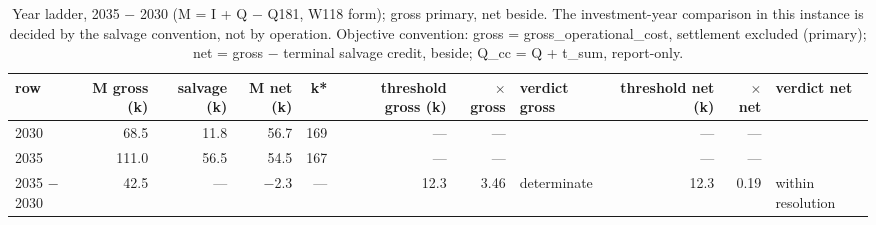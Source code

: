 \begin{table}[htbp]
\centering
\scriptsize
\caption{Year ladder, 2035 $-$ 2030 (M = I + Q $-$ Q181, W118 form); gross primary, net beside. The investment-year comparison in this instance is decided by the salvage convention, not by operation. Objective convention: gross = gross\_operational\_cost, settlement excluded (primary); net = gross $-$ terminal salvage credit, beside; Q\_cc = Q + t\_sum, report-only.}
\label{tab:T4}
\begin{tabular}{lrrrrrrlrrl}
\toprule
row & M gross (k\texteuro{}) & salvage (k\texteuro{}) & M net (k\texteuro{}) & k* & threshold gross (k\texteuro{}) & $\times$ gross & verdict gross & threshold net (k\texteuro{}) & $\times$ net & verdict net \\
\midrule
2030 & 68.5 & 11.8 & 56.7 & 169 & --- & --- &  & --- & --- &  \\
2035 & 111.0 & 56.5 & 54.5 & 167 & --- & --- &  & --- & --- &  \\
2035 $-$ 2030 & 42.5 & --- & $-$2.3 & --- & 12.3 & 3.46 & determinate & 12.3 & 0.19 & within resolution \\
\bottomrule
\end{tabular}
\end{table}
